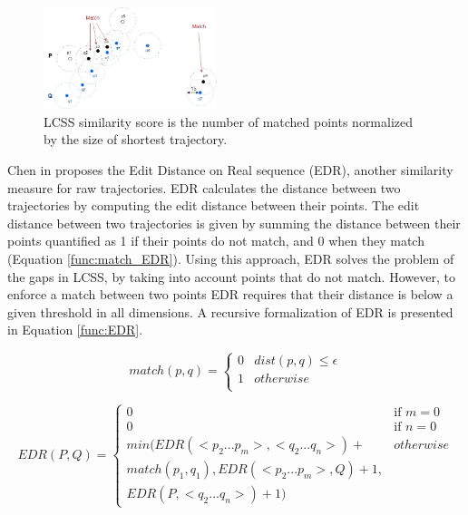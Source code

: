 \begin{figure}[h]
\centering
\includegraphics[width=0.45\textwidth]{Related_Works/related_trajes-LCSS.jpg}
\caption{\label{fig:related_trajes_LCSS}LCSS similarity score is the number of matched points normalized by the size of shortest trajectory.}
\end{figure}

Chen in \cite{Chen:2005:RFS:1066157.1066213} proposes the Edit Distance on Real sequence (EDR), another similarity measure for raw trajectories. EDR calculates the distance between two trajectories by computing the edit distance between their points. The edit distance between two trajectories is given by summing the distance between their points quantified as 1 if their points do not match, and 0 when they match (Equation \ref{func:match_EDR}). Using this approach, EDR solves the problem of the gaps in LCSS, by taking into account points that do not match. However, to enforce a match between two points EDR requires that their distance is below a given threshold in all dimensions.
A recursive  formalization of EDR is presented in Equation \ref{func:EDR}.

\begin{equation}
\label{func:match_EDR}
  match(p, q) = 
  \begin{cases} 
      0 & dist(p, q) \leq \epsilon \\ 
      1 & otherwise\\
  \end{cases}
\end{equation}

\begin{equation}
\label{func:EDR}
  EDR(P, Q) = 
  \begin{cases} 
      0 & \text{if } m = 0\\ 
      0 & \text{if } n = 0\\ 
      min(EDR(<p_2...p_m>,<q_2...q_n>) +  & otherwise\\
      match(p_1, q_1), EDR(<p_2...p_m>, Q) + 1, \\
      EDR(P, <q_2...q_n>) + 1) &
  \end{cases}
\end{equation}

